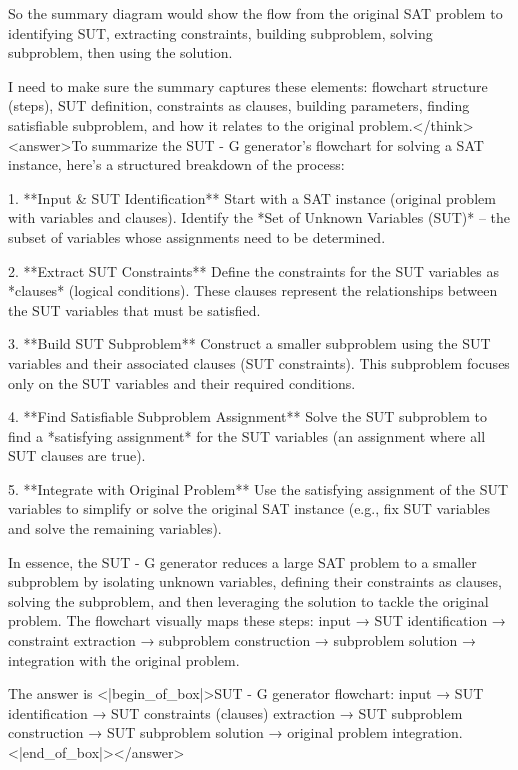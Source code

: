 So the summary diagram would show the flow from the original SAT problem to identifying SUT, extracting constraints, building subproblem, solving subproblem, then using the solution. 

I need to make sure the summary captures these elements: flowchart structure (steps), SUT definition, constraints as clauses, building parameters, finding satisfiable subproblem, and how it relates to the original problem.</think><answer>To summarize the SUT - G generator’s flowchart for solving a SAT instance, here’s a structured breakdown of the process:  

1. **Input & SUT Identification**  
   Start with a SAT instance (original problem with variables and clauses). Identify the *Set of Unknown Variables (SUT)* – the subset of variables whose assignments need to be determined.  

2. **Extract SUT Constraints**  
   Define the constraints for the SUT variables as *clauses* (logical conditions). These clauses represent the relationships between the SUT variables that must be satisfied.  

3. **Build SUT Subproblem**  
   Construct a smaller subproblem using the SUT variables and their associated clauses (SUT constraints). This subproblem focuses only on the SUT variables and their required conditions.  

4. **Find Satisfiable Subproblem Assignment**  
   Solve the SUT subproblem to find a *satisfying assignment* for the SUT variables (an assignment where all SUT clauses are true).  

5. **Integrate with Original Problem**  
   Use the satisfying assignment of the SUT variables to simplify or solve the original SAT instance (e.g., fix SUT variables and solve the remaining variables).  


In essence, the SUT - G generator reduces a large SAT problem to a smaller subproblem by isolating unknown variables, defining their constraints as clauses, solving the subproblem, and then leveraging the solution to tackle the original problem. The flowchart visually maps these steps: input → SUT identification → constraint extraction → subproblem construction → subproblem solution → integration with the original problem.  

The answer is <|begin_of_box|>SUT - G generator flowchart: input → SUT identification → SUT constraints (clauses) extraction → SUT subproblem construction → SUT subproblem solution → original problem integration.<|end_of_box|></answer>